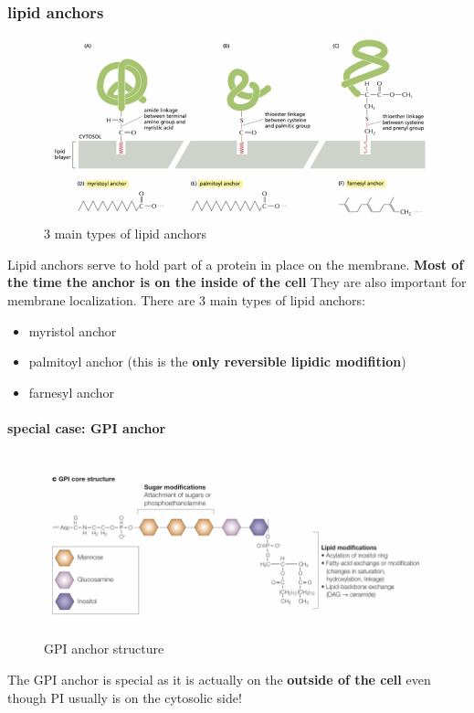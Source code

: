 \documentclass[../main.tex]{subfiles}
\begin{document}
\subsubsection{lipid anchors}
\begin{figure}[H]
    \centering
    \includegraphics[width=0.5\linewidth]{lipid_anchors.png}
    \caption{3 main types of lipid anchors}
    \label{fig:enter-label}
\end{figure}
Lipid anchors serve to hold part of a protein in place on the membrane. \textbf{Most of the time the anchor is on the inside of the cell} They are also important for membrane localization. There are 3 main types of lipid anchors:
\begin{itemize}
    \item myristol anchor
    \item palmitoyl anchor (this is the \textbf{only reversible lipidic modifition})
    \item farnesyl anchor
    
\end{itemize}

\paragraph{special case: GPI anchor}

\begin{figure}[H]
    \centering
    \includegraphics[width=\linewidth]{GPI.png}
    \caption{GPI anchor structure}
    \label{fig:enter-label}
\end{figure}
The GPI anchor is special as it is actually on the \textbf{outside of the cell} even though PI usually is on the cytosolic side! 
\end{document}
